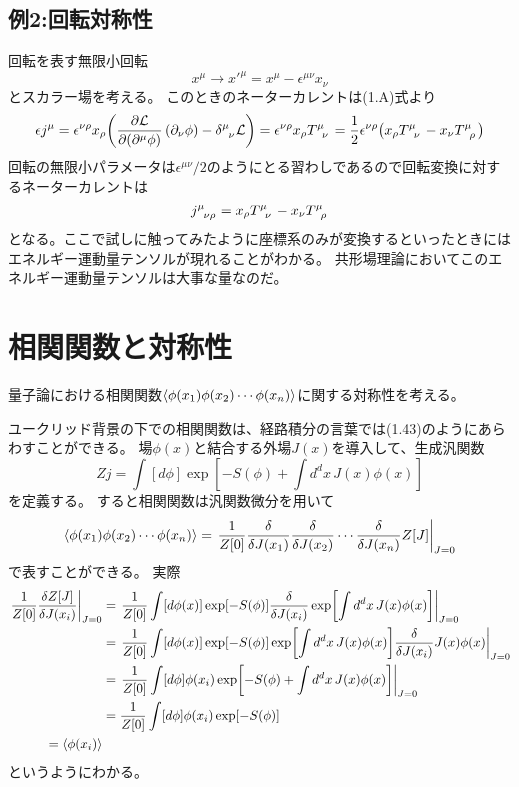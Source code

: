 \documentclass[../../master.tex]{subfiles}
\begin{document}
\subsection*{例2:回転対称性}
回転を表す無限小回転
\begin{equation*}
    x^\mu \rightarrow x'^\mu = x^\mu - \epsilon^{\mu\nu}x_\nu
\end{equation*}
とスカラー場を考える。
このときのネーターカレントは(1.A)式より
\begin{align*}
    \epsilon j^\mu
    = \epsilon^{\nu\rho}x_\rho\qty(\pdv{\mathcal{L}}{(\partial^\mu \phi)}\,(\partial_\nu \phi) - \delta\indices{^\mu_\nu}\mathcal{L})
    = \epsilon^{\nu\rho}x_\rho T\indices{^\mu_\nu}
    = \frac{1}{2}\epsilon^{\nu\rho}\qty(x_\rho T\indices{^\mu_\nu}-x_\nu T\indices{^\mu_\rho})
\end{align*}
回転の無限小パラメータは\(\epsilon^{\mu\nu}/2\)のようにとる習わしであるので回転変換に対するネーターカレントは
\begin{equation*}
    j\indices{^\mu_\nu_\rho} = x_\rho T\indices{^\mu_\nu}-x_\nu T\indices{^\mu_\rho}
\end{equation*}
となる。ここで試しに触ってみたように座標系のみが変換するといったときにはエネルギー運動量テンソルが現れることがわかる。
共形場理論においてこのエネルギー運動量テンソルは大事な量なのだ。

\section{相関関数と対称性}
量子論における相関関数\(\ev{\phi(x_1)\phi(x_2)\cdots\phi(x_n)}\)に関する対称性を考える。

ユークリッド背景の下での相関関数は、経路積分の言葉では(1.43)のようにあらわすことができる。
場\(\phi(x)\)と結合する外場\(J(x)\)を導入して、生成汎関数
\setcounter{equation}{59}
\begin{equation}
    Z{j} = \int [d\phi] \exp[-S(\phi)+\int d^dx\, J(x)\phi(x)]
\end{equation}
を定義する。
すると相関関数は汎関数微分を用いて
\begin{equation}
    \ev{\phi(x_1)\phi(x_2)\cdots\phi(x_n)} = \left. \frac{1}{Z[0]}\fdv{J(x_1)}\fdv{J(x_2)}\cdots\fdv{J(x_n)}Z[J]\right|_{J=0}
\end{equation}
で表すことができる。
実際
\begin{align*}
    \left.\frac{1}{Z[0]}\fdv{Z[J]}{J(x_i)}\right|_{J=0}
    &= \left.\frac{1}{Z[0]}\int [d\phi(x)]\exp[-S(\phi)]\fdv{J(x_i)}\exp[\int d^dx\, J(x)\phi(x)]\right|_{J=0}\\
    &= \left.\frac{1}{Z[0]}\int [d\phi(x)]\exp[-S(\phi)]\exp[\int d^dx\, J(x)\phi(x)]\fdv{J(x_i)}J(x)\phi(x)\right|_{J=0}\\
    &= \left.\frac{1}{Z[0]}\int [d\phi] \phi(x_i)\exp[-S(\phi)+\int d^dx\, J(x)\phi(x)]\right|_{J=0}\\
    &= \frac{1}{Z[0]}\int [d\phi] \phi(x_i)\exp[-S(\phi)]\\
    =\ev{\phi(x_i)}
\end{align*}
というようにわかる。
\end{document}

